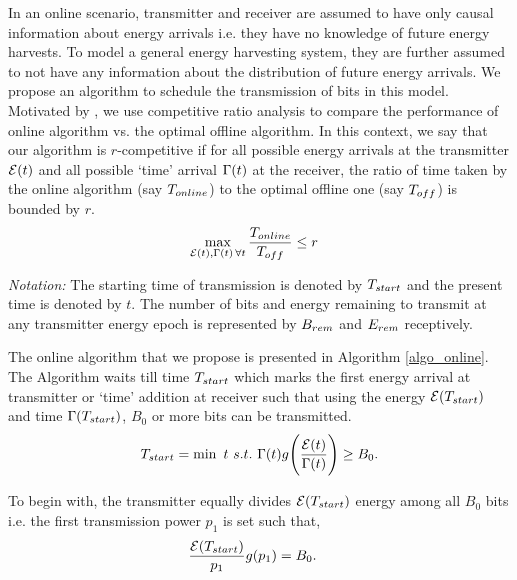 In an online scenario, transmitter and receiver are assumed to have only causal information about energy arrivals i.e. they have no knowledge of future energy harvests. To model a general energy harvesting system, they are further assumed to not have any information about the distribution of future energy arrivals. We propose an algorithm to schedule the transmission of bits in this model. Motivated by \cite{VazeCompetitive}, we use competitive ratio analysis to compare the performance of online algorithm vs. the optimal offline algorithm. In this context, we say that our algorithm is $r$-competitive if for all possible energy arrivals at the transmitter $\mathcal{E}(t)$ and all possible `time' arrival $\Gamma(t)$ at the receiver, the ratio of time taken by the online algorithm (say $T_{\mbox{\scriptsize{online}}}$) to the optimal offline one (say $T_{\mbox{\scriptsize{off}}}$) is bounded by $r$.
\begin{align}
&\displaystyle\max_{\ETx(t),\TRx(t)\hspace{0.5mm} \forall t}\dfrac{T_{\mbox{\scriptsize{online}}}}{T_{\mbox{\scriptsize{off}}}}\le r
\end{align}
 
\textit{Notation:} The starting time of transmission is denoted by $T_{\mbox{\scriptsize{start}}}$ and the present time is denoted by $t$. The number of bits and energy remaining to transmit at any transmitter energy epoch is represented by $B_{\mbox{\scriptsize{rem}}}$ and $E_{\mbox{\scriptsize{rem}}}$ receptively.

The online algorithm that we propose is presented in Algorithm \ref{algo_online}. The Algorithm waits till time $T_{\mbox{\scriptsize{start}}}$ which marks the first energy arrival at transmitter or `time' addition at receiver such that using the energy $\ETx(T_{\mbox{\scriptsize{start}}})$ and time $\TRx(T_{\mbox{\scriptsize{start}}})$, $B_0$ or more bits can be transmitted.
\begin{equation}
T_{\mbox{\scriptsize{start}}}=\min\ t \ s.t.\  \TRx(t)g\Bigg{(} \dfrac{\ETx(t)}{\TRx(t)}\Bigg{)}\ge B_0.\label{online_T_start}
\end{equation}

To begin with, the transmitter equally divides $\ETx(T_{\mbox{\scriptsize{start}}})$ energy among all $B_0$ bits i.e. the first transmission power $p_1$ is set such that,
\begin{align}
&\frac{\ETx(T_{\mbox{\scriptsize{start}}})}{p_1}g(p_1)=B_0.
\end{align}

